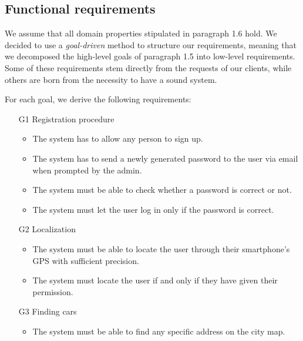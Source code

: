 
\subsection{Functional requirements}
We assume that all domain properties stipulated in paragraph 1.6 hold. We decided to use a \textit{goal-driven} method to structure our requirements, meaning that we decomposed the high-level goals of paragraph 1.5 into low-level requirements.
Some of these requirements stem directly from the requests of our clients, while others are born from the necessity to have a sound system.

For each goal, we derive the following requirements:


\begin{itemize}


				\item [G1] Registration procedure %
					\begin{itemize}
						\item The system has to allow any person to sign up.
						\item The system has to send a newly generated password to the user via email when prompted by the admin.
						\item The system must be able to check whether a password is correct or not.
						\item The system must let the user log in only if the password is correct. 
					\end{itemize}
				\item [G2] Localization %
					\begin{itemize}
						\item The system must be able to locate the user through their smartphone's GPS with sufficient precision.
						\item The system must locate the user if and only if they have given their permission. 
					\end{itemize}
				\item [G3] Finding cars %
					\begin{itemize}
						\item The system must be able to find any specific address on the city map. %

\end{itemize}
\end{itemize}
